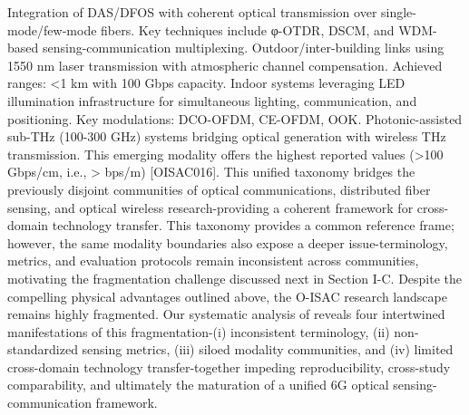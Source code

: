 {}\markdownRendererOlBegin
{} Integration of DAS/DFOS with coherent optical transmission over single-mode/few-mode fibers. Key techniques include φ-OTDR, DSCM, and WDM-based sensing-communication multiplexing.\markdownRendererOlItemEnd 
{} Outdoor/inter-building links using 1550 nm laser transmission with atmospheric channel compensation. Achieved ranges: <1 km with 100 Gbps capacity.\markdownRendererOlItemEnd 
{} Indoor systems leveraging LED illumination infrastructure for simultaneous lighting, communication, and positioning. Key modulations: DCO-OFDM, CE-OFDM, OOK.\markdownRendererOlItemEnd 
{} Photonic-assisted sub-THz (100-300 GHz) systems bridging optical generation with wireless THz transmission. This emerging modality offers the highest reported  values (>100 Gbps/cm, i.e., > bps/m) [O\markdownRendererUnderscore{}ISAC\markdownRendererUnderscore{}016].\markdownRendererOlItemEnd 
\markdownRendererOlEnd \markdownRendererInterblockSeparator
{}This unified taxonomy bridges the previously disjoint communities of optical communications, distributed fiber sensing, and optical wireless research-providing a coherent framework for cross-domain technology transfer. This taxonomy provides a common reference frame; however, the same modality boundaries also expose a deeper issue-terminology, metrics, and evaluation protocols remain inconsistent across communities, motivating the fragmentation challenge discussed next in Section I-C.\markdownRendererInterblockSeparator
{}
\markdownRendererSectionEnd 
\markdownRendererSectionEnd \markdownRendererSectionBegin
{}\markdownRendererInterblockSeparator
{}Despite the compelling physical advantages outlined above, the O-ISAC research landscape remains highly fragmented. Our systematic analysis of  reveals four intertwined manifestations of this fragmentation-(i) inconsistent terminology, (ii) non-standardized sensing metrics, (iii) siloed modality communities, and (iv) limited cross-domain technology transfer-together impeding reproducibility, cross-study comparability, and ultimately the maturation of a unified 6G optical sensing-communication framework.\markdownRendererParagraphSeparator
